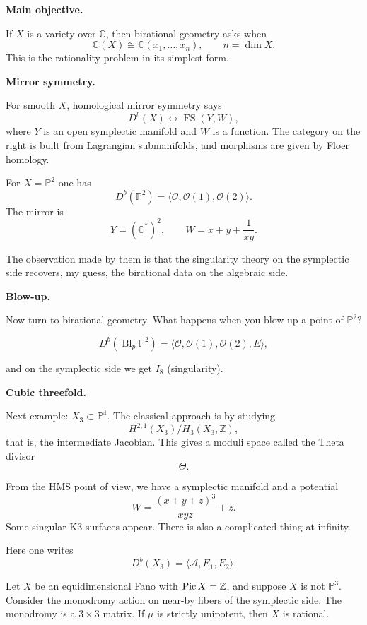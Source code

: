 \medskip\noindent
{\bf Main objective.}

If $X$ is a variety over
$\mathbb{C}$,
then birational geometry asks when
$$
\mathbb{C}(X)
\cong
\mathbb{C}(x_1,\dots,x_n),
\qquad
n=\dim X.
$$
This is the rationality problem in
its simplest form.

\medskip\noindent
{\bf Mirror symmetry.}

For smooth $X$, homological mirror
symmetry says
$$
D^b(X)
\leftrightarrow
\operatorname{FS}(Y,W),
$$
where $Y$ is an open symplectic
manifold and $W$ is a function.
The category on the right is built
from Lagrangian submanifolds, and
morphisms are given by Floer
homology.

\begin{example}
For $X=\mathbb{P}^2$ one has
$$
D^b(\mathbb{P}^2)=
\langle
\mathcal{O},
\mathcal{O}(1),
\mathcal{O}(2)
\rangle.
$$
The mirror is
$$
Y=(\mathbb{C}^*)^2,
\qquad
W=x+y+\frac{1}{xy}.
$$

The observation made by them is that
the singularity theory on the
symplectic side recovers, my guess,
the birational data on the algebraic
side.

\end{example}

\medskip\noindent
{\bf Blow-up.}

Now turn to birational geometry.
What happens when you blow up a
point of $\mathbb{P}^2$?

$$
D^b(\operatorname{Bl}_p \mathbb{P}^2)=
\langle
\mathcal{O},
\mathcal{O}(1),
\mathcal{O}(2),
E
\rangle,
$$

and on the symplectic side we get
$I_8$
(singularity).

\medskip\noindent
{\bf Cubic threefold.}

Next example:
$X_3 \subset \mathbb{P}^4$.
The classical approach is by studying
$$
H^{2,1}(X_3)/
H_3(X_3,\mathbb{Z}),
$$
that is, the intermediate Jacobian.
This gives a moduli space called the
Theta divisor
$$
\Theta.
$$

\begin{example}
\label{example-hms-point}
From the HMS point of view,
we have a symplectic manifold
and a potential
$$
W=
\frac{(x+y+z)^3}{xyz}+z.
$$
Some singular K3 surfaces appear.
There is also a complicated thing
at infinity.

Here one writes
$$
D^b(X_3)=
\langle
\mathcal{A},
E_1,
E_2
\rangle.
$$
\end{example}

\begin{theorem}[(-, Prizholkovsky, 2005)]
\label{theorem-let-x}
Let $X$ be an equidimensional Fano
with $\mathop{\mathrm{Pic}}\nolimits X = \mathbb{Z}$,
and suppose $X$ is not
$\mathbb{P}^3$.
Consider the monodromy action on
near-by fibers of the symplectic
side.
The monodromy is a $3\times 3$
matrix.
If $\mu$ is strictly unipotent,
then $X$ is rational.
\end{theorem}


